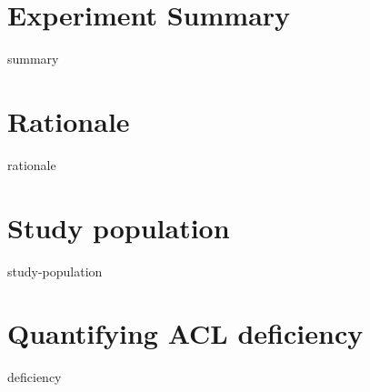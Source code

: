 \section{Experiment Summary}
	{summary}
\section{Rationale}
	{rationale}
\section{Study population}
    {study-population}
\section{Quantifying ACL deficiency}
    {deficiency}


